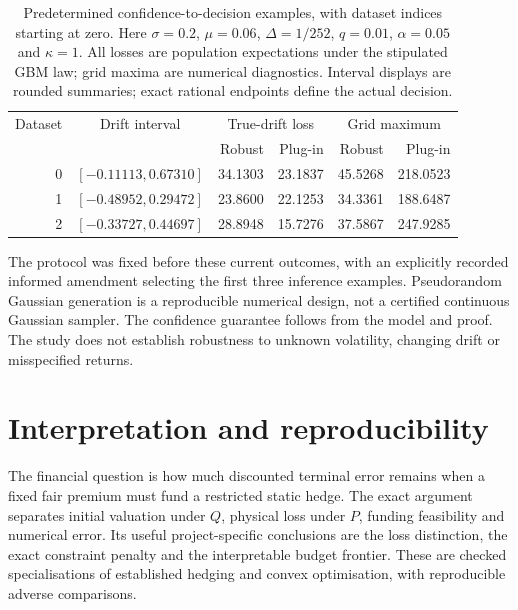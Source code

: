 \documentclass[11pt]{article}
\begin{document}
\begin{table}[tb]
\centering\small
\begin{tabular}{rcrrrr}
\toprule
Dataset & Drift interval & \multicolumn{2}{c}{True-drift loss}
 & \multicolumn{2}{c}{Grid maximum} \\
 & & Robust & Plug-in & Robust & Plug-in \\
\midrule
0 & $[-0.11113,0.67310]$ & 34.1303 & 23.1837 & 45.5268 & 218.0523 \\
1 & $[-0.48952,0.29472]$ & 23.8600 & 22.1253 & 34.3361 & 188.6487 \\
2 & $[-0.33727,0.44697]$ & 28.8948 & 15.7276 & 37.5867 & 247.9285 \\
\bottomrule
\end{tabular}
\caption{Predetermined confidence-to-decision examples, with dataset indices
starting at zero. Here $\sigma=0.2$, $\mu=0.06$, $\Delta=1/252$,
$q=0.01$, $\alpha=0.05$ and $\kappa=1$. All losses are population
expectations under the stipulated GBM law; grid maxima are numerical
diagnostics. Interval displays are rounded summaries; exact rational
endpoints define the actual decision.}
\label{tab:h-drift-bridge}
\end{table}

The protocol was fixed before these current outcomes, with an explicitly
recorded informed amendment selecting the first three inference examples.
Pseudorandom Gaussian generation is a reproducible numerical design,
not a certified continuous Gaussian sampler. The confidence guarantee
follows from the model and proof. The study does not establish robustness
to unknown volatility, changing drift or misspecified returns.


\section{Interpretation and reproducibility}

The financial question is how much discounted terminal error remains
when a fixed fair premium must fund a restricted static hedge.
The exact argument separates initial valuation under $Q$, physical
loss under $P$, funding feasibility and numerical error. Its useful
project-specific conclusions are the loss distinction, the exact
constraint penalty and the interpretable budget frontier. These are
checked specialisations of established hedging and convex optimisation,
with reproducible adverse comparisons.
\end{document}
